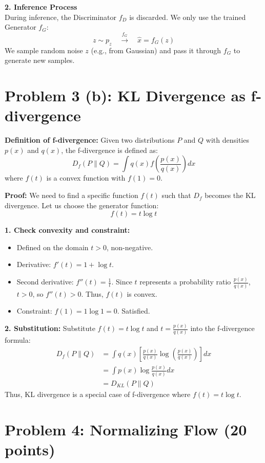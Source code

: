 \documentclass[12pt]{article}
\begin{document}
\textbf{2. Inference Process} \\
During inference, the Discriminator $f_D$ is discarded. We only use the trained Generator $f_G$:
\[
    z \sim p_z \quad \xrightarrow{f_G} \quad \hat{x} = f_G(z)
\]
We sample random noise $z$ (e.g., from Gaussian) and pass it through $f_G$ to generate new samples.

\section*{Problem 3 (b): KL Divergence as f-divergence}

\textbf{Definition of f-divergence:}
Given two distributions $P$ and $Q$ with densities $p(x)$ and $q(x)$, the f-divergence is defined as:
\[
    D_f(P \| Q) = \int q(x) f\left( \frac{p(x)}{q(x)} \right) dx
\]
where $f(t)$ is a convex function with $f(1) = 0$.

\textbf{Proof:}
We need to find a specific function $f(t)$ such that $D_f$ becomes the KL divergence.
Let us choose the generator function:
\[
    f(t) = t \log t
\]

\textbf{1. Check convexity and constraint:}
\begin{itemize}
    \item Defined on the domain $t > 0$, non-negative.
    \item Derivative: $f'(t) = 1 + \log t$.
    \item Second derivative: $f''(t) = \frac{1}{t}$. Since $t$ represents a probability ratio $\frac{p(x)}{q(x)}$, $t > 0$, so $f''(t) > 0$. Thus, $f(t)$ is convex.
    \item Constraint: $f(1) = 1 \log 1 = 0$. Satisfied.
\end{itemize}

\textbf{2. Substitution:}
Substitute $f(t) = t \log t$ and $t = \frac{p(x)}{q(x)}$ into the f-divergence formula:
\[
\begin{aligned}
    D_f(P \| Q) &= \int q(x) \left[ \frac{p(x)}{q(x)} \log \left( \frac{p(x)}{q(x)} \right) \right] dx \\
    &= \int p(x) \log \frac{p(x)}{q(x)} dx \\
    &= D_{KL}(P \| Q)
\end{aligned}
\]
Thus, KL divergence is a special case of f-divergence where $f(t) = t \log t$.



\section*{Problem 4: Normalizing Flow (20 points)}
\end{document}
